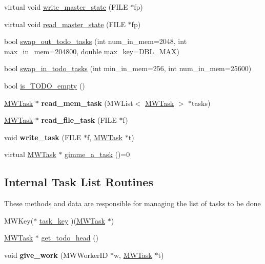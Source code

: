 \begin{DoxyCompactItemize}
\item 
virtual void \hyperlink{classMWDriver_ab3a42409894c40f6992f01b433174588}{write\+\_\+master\+\_\+state} (F\+I\+LE $\ast$fp)
\item 
virtual void \hyperlink{classMWDriver_ab575d8dec66c8edadc165ebc6ea4e5a9}{read\+\_\+master\+\_\+state} (F\+I\+LE $\ast$fp)
\item 
bool \hyperlink{classMWDriver_afa05516157b292a420ba6770fd2f493c}{swap\+\_\+out\+\_\+todo\+\_\+tasks} (int num\+\_\+in\+\_\+mem=2048, int max\+\_\+in\+\_\+mem=204800, double max\+\_\+key=D\+B\+L\+\_\+\+M\+AX)
\item 
bool \hyperlink{classMWDriver_aaa70ab2dd6087ef2415824f770747f8f}{swap\+\_\+in\+\_\+todo\+\_\+tasks} (int min\+\_\+in\+\_\+mem=256, int num\+\_\+in\+\_\+mem=25600)
\item 
bool \hyperlink{classMWDriver_a184d950e15be4aa0ecb22d7eaea622fe}{is\+\_\+\+T\+O\+D\+O\+\_\+empty} ()
\item 
\mbox{\label{classMWDriver_a394381ef1a29bd1300184793e0e8c5da}} 
\hyperlink{classMWTask}{M\+W\+Task} $\ast$ {\bfseries read\+\_\+mem\+\_\+task} (M\+W\+List$<$ \hyperlink{classMWTask}{M\+W\+Task} $>$ $\ast$tasks)
\item 
\mbox{\label{classMWDriver_ade316a0388ef55bf25048ed484b66a05}} 
\hyperlink{classMWTask}{M\+W\+Task} $\ast$ {\bfseries read\+\_\+file\+\_\+task} (F\+I\+LE $\ast$f)
\item 
\mbox{\label{classMWDriver_a9791a018c5711fd6590af5f29d49877f}} 
void {\bfseries write\+\_\+task} (F\+I\+LE $\ast$f, \hyperlink{classMWTask}{M\+W\+Task} $\ast$t)
\item 
virtual \hyperlink{classMWTask}{M\+W\+Task} $\ast$ \hyperlink{classMWDriver_a7d37eab370800bcc1fed37bff6c92643}{gimme\+\_\+a\+\_\+task} ()=0
\end{DoxyCompactItemize}
\subsection*{Internal Task List Routines}
\label{_amgrp9019d3d58b7b19d8d54671bc7d140680}%
These methods and data are responsible for managing the list of tasks to be done \begin{DoxyCompactItemize}
\item 
M\+W\+Key($\ast$ \hyperlink{classMWDriver_a1d359e2a84216713f63d93ff343c68b2}{task\+\_\+key} )(\hyperlink{classMWTask}{M\+W\+Task} $\ast$)
\item 
\hyperlink{classMWTask}{M\+W\+Task} $\ast$ \hyperlink{classMWDriver_aded3f8d1e5aa80a2492387533195d0aa}{get\+\_\+todo\+\_\+head} ()
\item 
\mbox{\label{classMWDriver_a5de7c64341a08fd5badd62451c0c24dd}} 
void {\bfseries give\+\_\+work} (M\+W\+Worker\+ID $\ast$w, \hyperlink{classMWTask}{M\+W\+Task} $\ast$t)
\end{DoxyCompactItemize}
